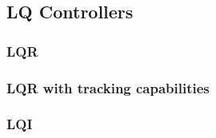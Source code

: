 \subsection{LQ Controllers}
\label{subsec:lq_controllers}

\subsubsection{LQR}
\label{subsubsec:lqr}

\subsubsection{LQR with tracking capabilities}
\label{subsubsec:lqr_tracking}

\subsubsection{LQI}
\label{subsubsec:lqi}